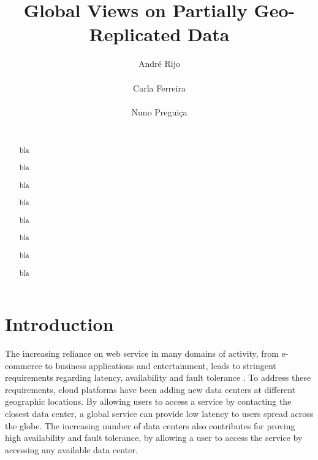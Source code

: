 \documentclass{vldb}
\begin{document}
\title{Global Views on Partially Geo-Replicated Data}

\author{\alignauthor André Rijo\\
       \\
\alignauthor Carla Ferreira\\
       \\
\alignauthor
Nuno Preguiça\\
       \\
}


\maketitle

\begin{abstract}
bla

bla

bla

bla

bla

bla

bla

bla

\end{abstract}

\section{Introduction}


The increasing reliance on web service in many domains of activity, from e-commerce to business applications
and entertainment, leads to stringent requirements regarding latency, availability and fault tolerance \cite{Schurman2009latency,gomez}.
To address these requirements, cloud platforms have been adding new data centers at different geographic 
locations. By allowing users to access a service by contacting the closest data center, a global service can
provide low latency to users spread across the globe. The increasing number of data centers also contributes
for proving high availability and fault tolerance, by allowing a user to access the service by accessing any
available data center.
\end{document}
